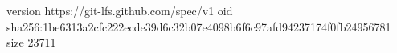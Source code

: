 version https://git-lfs.github.com/spec/v1
oid sha256:1be6313a2cfc222ecde39d6c32b07e4098b6f6c97afd94237174f0fb24956781
size 23711
